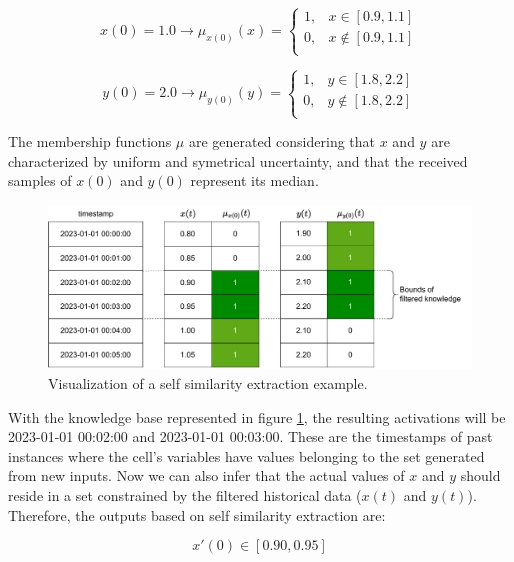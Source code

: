 \begin{equation}
    x(0) = 1.0 \rightarrow \mu_{x(0)}(x) =
    \begin{cases}
        1, & x \in [0.9, 1.1]    \\
        0, & x \notin [0.9, 1.1] \\
    \end{cases}
\end{equation}

\begin{equation}
    y(0) = 2.0 \rightarrow \mu_{y(0)}(y) =
    \begin{cases}
        1, & y \in [1.8, 2.2]    \\
        0, & y \notin [1.8, 2.2] \\
    \end{cases}
\end{equation}

The membership functions $\mu$ are generated considering that $x$ and $y$ are characterized by uniform and symetrical uncertainty, and that the received samples of $x(0)$ and $y(0)$ represent its median.

\begin{figure}[h!]
    \centering
    \includegraphics[width=\linewidth]{figures/chapter4/cell/solo_state_estimation.pdf}
    \caption{Visualization of a self similarity extraction example.}
    \label{fig:solo_state_estimation}
\end{figure}


With the knowledge base represented in figure \ref{fig:solo_state_estimation}, the resulting activations will be 2023-01-01 00:02:00 and 2023-01-01 00:03:00. These are the timestamps of past instances where the cell's variables have values belonging to the set generated from new inputs. Now we can also infer that the actual values of $x$ and $y$ should reside in a set constrained by the filtered historical data ($x(t)$ and $y(t)$). Therefore, the outputs based on self similarity extraction are:

\begin{equation}
    x'(0) \in [0.90, 0.95]
\end{equation}

